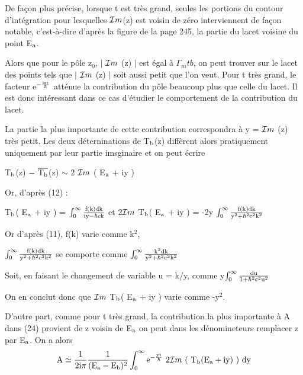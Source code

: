 De façon plus précise, lorsque t est très grand, seules les portions du contour d'intégration pour lesquelles $\mathcal{I}m$(z) est voisin de zéro interviennent de façon notable, c'est-à-dire d'après la figure de la page 245,
la partie du lacet voisine du point E$_{\text{a}}$.

Alors que pour le pôle z$_0$, $|$ $\mathcal{I}m$ (z) $|$ est égal à $\Gamma_mt{b}$, on peut
trouver sur le lacet des points tels que $|$ $\mathcal{I}m$ (z) $|$ soit aussi petit que l'on
veut. Pour t très grand, le facteur e$^{-\frac{\text{izt}}{\hbar}}$ atténue la contribution du pôle
beaucoup plus que celle du lacet. Il est donc intéressant dans ce cas d'étudier
le comportement de la contribution du lacet.

La partie la plus importante de cette contribution correspondra
à y = $\mathcal{I}m$ (z) très petit. Les deux déterninations de T$_{\text{b}}$(z) diffèrent alors pratiquement uniquement par leur partie imsginaire et on peut écrire
\begin{center}
T$_{\text{b}}$(z) $-\ \overline{\text{T}_{\text{b}}}$(z) $\sim$ 2 $\mathcal{I}m$ ( E$_{\text{a}}$ $+$ iy )
\end{center}

Or, d'après (12) :
\begin{center}
T$_{\text{b}}$( E$_{\text{a}}$ $+$ iy ) = $\int_0^\infty\frac{\text{f(k)dk}}{\text{iy} - \hbar\text{ck}}$
\hspace{1cm} et \hspace{1cm}
2$\mathcal{I}m$ T$_{\text{b}}$( E$_{\text{a}}$ $+$ iy ) = -2y $\int_0^\infty\frac{\text{f(k)dk}}{\text{y}^2 + \hbar^2\text{c}^2\text{k}^2}$
\end{center}

Or d'après (11), f(k) varie comme k$^2$,
\begin{center}
$\int_0^\infty\frac{\text{f(k)dk}}{\text{y}^2 + \hbar^2\text{c}^2\text{k}^2}$
\hspace{1cm} se comporte comme \hspace{1cm}
$\int_0^\infty\frac{\text{k}^2\text{dk}}{\text{y}^2 + \hbar^2\text{c}^2\text{k}^2}$
\end{center}



Soit, en faisant le changement de variable u = k/y,
comme y$\int_0^\infty\frac{\text{du}}{1+ \hbar^2\text{c}^2\text{u}^2}$

On en conclut donc que $\mathcal{I}m$ T$_{\text{b}}$( E$_{\text{a}}$ $+$ iy ) varie comme -y$^2$.

D'autre part, comme pour t très grand, la contribution la plus
importante à A dans (24) provient de z voisin de E$_{\text{a}}$ on peut dans les dénomineteurs remplacer z par E$_{\text{a}}$. On a alors
\[
\mt{A}\simeq\frac{1}{2\mt{i}\pi}\frac{1}{(\mt{E}_\mt{a}-\mt{E}_\mt{b})^2}\int_0^\infty\mt{e}^{-\frac{\mt{yt}}{\hbar}}
\ 2\mc{I}m\ (\ \mt{T}_\mt{b}(\mt{E}_\mt{a}+\mt{iy})\ )\ \mt{dy}
\]

